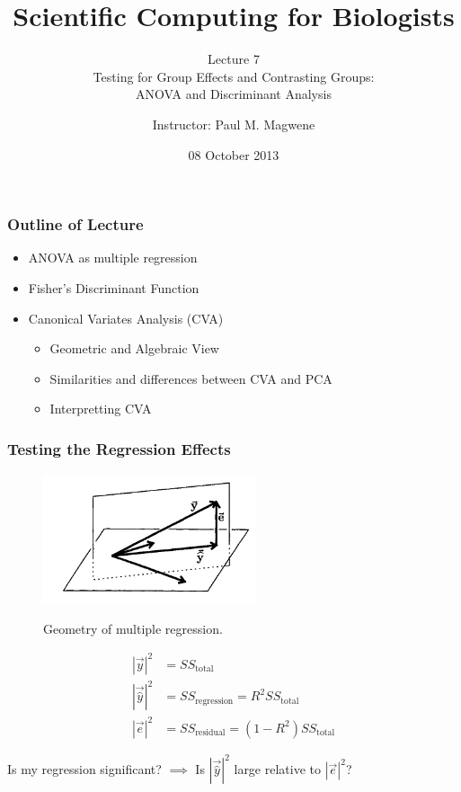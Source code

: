 \documentclass{beamer}
\title{Scientific Computing for Biologists}
\subtitle{Lecture 7 \\
        Testing for Group Effects and Contrasting Groups:\\
         ANOVA and Discriminant Analysis}
\author{Instructor: Paul M. Magwene}
\date{08 October 2013}
\begin{document}
\begin{frame}
\titlepage
\end{frame}


\begin{frame}
  \frametitle{Outline of Lecture}

\begin{itemize}
    \item ANOVA as multiple regression
    \item Fisher's Discriminant Function
    \item Canonical Variates Analysis (CVA)
    \begin{itemize}
        \item Geometric and Algebraic View
        \item Similarities and differences between CVA and PCA
        \item Interpretting CVA
    \end{itemize}

\end{itemize}

\end{frame}



\begin{frame}[fragile]
  \frametitle{Testing the Regression Effects}

\begin{figure}
{\centering \includegraphics[height=1.5in]{fig-multireg.pdf}}
\caption{Geometry of multiple regression.}
\end{figure}
%
\begin{align*}
|\vec{y}|^2 &= SS_{\text{total}} \\
|\vec{\hat{y}}|^2 &= SS_{\text{regression}} = R^2 SS_{\text{total}}\\
|\vec{e}|^2 &= SS_{\text{residual}}  = (1-R^2)SS_{\text{total}}
\end{align*}
%
\begin{center}
\alert{Is my regression significant? $\implies$ Is $|\vec{\hat{y}}|^2$ large relative to $|\vec{e}|^2$?}
\end{center}

\end{frame}
\end{document}

